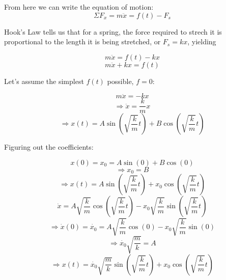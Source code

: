 \documentclass[11pt,letterpaper]{article}
\begin{document}
  From here we can write the equation of motion:\\

  $$\Sigma F_{x} = m\ddot{x} = f(t) - F_{s}$$

  Hook's Law tells us that for a spring, the force required to
  strech it is proportional to the length it is being stretched,
  or $F_s = kx$, yielding

  $$m\ddot{x} = f(t) - kx$$
  $$m\ddot{x} + kx = f(t)$$

  Let's assume the simplest $f(t)$ possible, $f = 0$:

  $$m\ddot{x} = -kx$$
  $$\Rightarrow \ddot{x} = \frac{k}{m}x$$
  $$\Rightarrow x(t) = A\sin\left(\sqrt{\frac{k}{m}}t\right) + B\cos\left(\sqrt{\frac{k}{m}}t\right)$$

  Figuring out the coefficients:

  $$x(0) = x_0 = A\sin\left(0\right) + B\cos\left(0\right)$$
  $$\Rightarrow x_0 = B$$
  $$\Rightarrow x(t) = A\sin\left(\sqrt{\frac{k}{m}}t\right) + x_{0}\cos\left(\sqrt{\frac{k}{m}}t\right)$$
  $$\dot{x} = A\sqrt{\frac{k}{m}}\cos\left(\sqrt{\frac{k}{m}}t\right) - x_{0}\sqrt{\frac{k}{m}}\sin\left(\sqrt{\frac{k}{m}}t\right)$$
  $$\Rightarrow \dot{x}(0) = \dot{x_0} = A\sqrt{\frac{k}{m}}\cos\left(0\right) - x_{0}\sqrt{\frac{k}{m}}\sin\left(0\right)$$
  $$\Rightarrow \dot{x_0}\sqrt{\frac{m}{k}} = A$$
  $$\Rightarrow x(t) = \dot{x_0}\sqrt{\frac{m}{k}}\sin\left(\sqrt{\frac{k}{m}}t\right) + x_{0}\cos\left(\sqrt{\frac{k}{m}}t\right)$$
\end{document}
